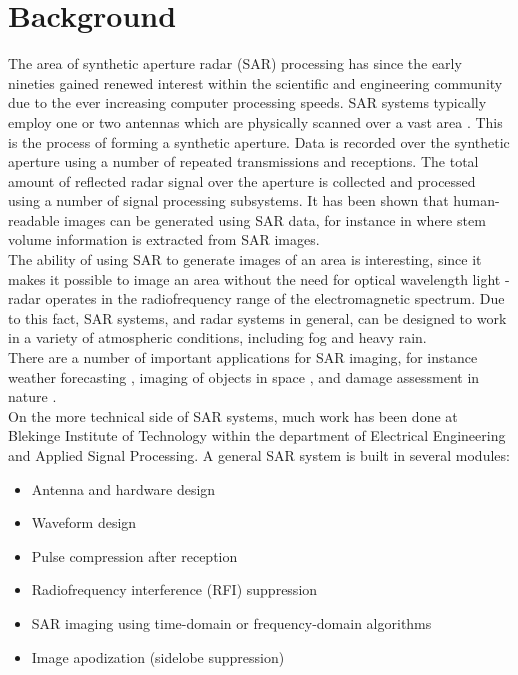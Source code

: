 \documentclass{chi2012}
\begin{document}
\section{Background}
The area of synthetic aperture radar (SAR) processing has since the early nineties gained renewed interest within the scientific and engineering community due to the ever increasing computer processing speeds. SAR systems typically employ one or two antennas  which are physically scanned over a vast area \cite{Skolnik}. This is the process of forming a synthetic aperture. Data is recorded over the synthetic aperture using a number of repeated transmissions and receptions. The total amount of reflected radar signal over the aperture is collected and processed using a number of signal processing subsystems. It has been shown that human-readable images can be generated using SAR data, for instance in \cite{folkesson-stem-volume} where stem volume information is extracted from SAR images.
\\
The ability of using SAR to generate images of an area is interesting, since it makes it possible to image an area without the need for optical wavelength light - radar operates in the radiofrequency range of the electromagnetic spectrum. Due to this fact, SAR systems, and radar systems in general, can be designed to work in a variety of atmospheric conditions, including fog and heavy rain.
\\
There are a number of important applications for SAR imaging, for instance weather forecasting \cite{liu-weather-sar}, imaging of objects in space \cite{freeman-sar-mars}, and damage assessment in nature \cite{fransson-damaged-forest}.\\

On the more technical side of SAR systems, much work has been done at Blekinge Institute of Technology within the department of Electrical Engineering and Applied Signal Processing. A general SAR system is built in several modules:
\begin{itemize}
  \item Antenna and hardware design
  \item Waveform design
  \item Pulse compression after reception
  \item Radiofrequency interference (RFI) suppression
  \item SAR imaging using time-domain or frequency-domain algorithms
  \item Image apodization (sidelobe suppression)
\end{itemize}
\end{document}
